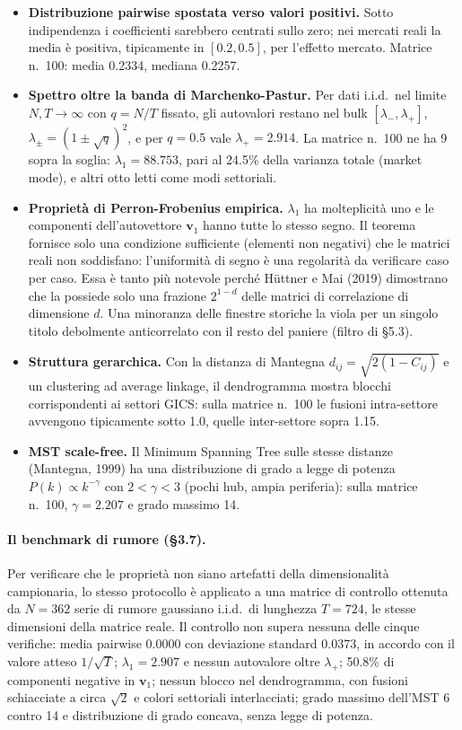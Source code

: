 \begin{itemize}[leftmargin=*, itemsep=2pt]
\item \textbf{Distribuzione pairwise spostata verso valori positivi.} Sotto indipendenza i coefficienti sarebbero centrati sullo zero; nei mercati reali la media è positiva, tipicamente in $[0.2, 0.5]$, per l'effetto mercato. Matrice n.~100: media 0.2334, mediana 0.2257.
\item \textbf{Spettro oltre la banda di Marchenko-Pastur.} Per dati i.i.d.\ nel limite $N, T \to \infty$ con $q = N/T$ fissato, gli autovalori restano nel bulk $[\lambda_-, \lambda_+]$, $\lambda_\pm = (1 \pm \sqrt{q})^2$, e per $q = 0.5$ vale $\lambda_+ = 2.914$. La matrice n.~100 ne ha 9 sopra la soglia: $\lambda_1 = 88.753$, pari al 24.5\% della varianza totale (market mode), e altri otto letti come modi settoriali.
\item \textbf{Proprietà di Perron-Frobenius empirica.} $\lambda_1$ ha molteplicità uno e le componenti dell'autovettore $\mathbf{v}_1$ hanno tutte lo stesso segno. Il teorema fornisce solo una condizione sufficiente (elementi non negativi) che le matrici reali non soddisfano: l'uniformità di segno è una regolarità da verificare caso per caso. Essa è tanto più notevole perché Hüttner e Mai (2019) dimostrano che la possiede solo una frazione $2^{1-d}$ delle matrici di correlazione di dimensione $d$. Una minoranza delle finestre storiche la viola per un singolo titolo debolmente anticorrelato con il resto del paniere (filtro di \S5.3).
\item \textbf{Struttura gerarchica.} Con la distanza di Mantegna $d_{ij} = \sqrt{2(1 - C_{ij})}$ e un clustering ad average linkage, il dendrogramma mostra blocchi corrispondenti ai settori GICS: sulla matrice n.~100 le fusioni intra-settore avvengono tipicamente sotto 1.0, quelle inter-settore sopra 1.15.
\item \textbf{MST scale-free.} Il Minimum Spanning Tree sulle stesse distanze (Mantegna, 1999) ha una distribuzione di grado a legge di potenza $P(k) \propto k^{-\gamma}$ con $2 < \gamma < 3$ (pochi hub, ampia periferia): sulla matrice n.~100, $\gamma = 2.207$ e grado massimo 14.
\end{itemize}

\paragraph{Il benchmark di rumore (\S3.7).} Per verificare che le proprietà non siano artefatti della dimensionalità campionaria, lo stesso protocollo è applicato a una matrice di controllo ottenuta da $N = 362$ serie di rumore gaussiano i.i.d.\ di lunghezza $T = 724$, le stesse dimensioni della matrice reale. Il controllo non supera nessuna delle cinque verifiche: media pairwise 0.0000 con deviazione standard 0.0373, in accordo con il valore atteso $1/\sqrt{T}$; $\lambda_1 = 2.907$ e nessun autovalore oltre $\lambda_+$; 50.8\% di componenti negative in $\mathbf{v}_1$; nessun blocco nel dendrogramma, con fusioni schiacciate a circa $\sqrt{2}$ e colori settoriali interlacciati; grado massimo dell'MST 6 contro 14 e distribuzione di grado concava, senza legge di potenza.

